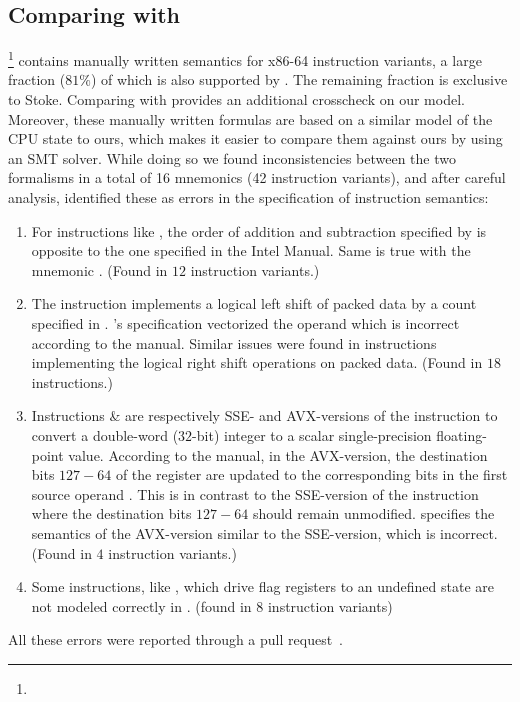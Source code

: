 \subsection{Comparing with \Stoke}\label{subsec:compare-stoke}
\footnote{} contains manually written semantics for \stokeIS{} x86-64 instruction variants, a large fraction ($81\%$) of which is also supported by \Strata. The remaining fraction is exclusive to Stoke. Comparing with \Stoke provides an additional crosscheck on our model.  Moreover, these manually written formulas are based on a similar model of the CPU state to ours, which makes it easier to compare them against ours by using an SMT solver. While doing so we found inconsistencies between the two formalisms in a total of 16 mnemonics (42 instruction variants), and after careful analysis, identified these as errors in the \Stoke specification of instruction semantics:
\begin{enumerate}%
    \item For instructions like  , the order of addition and subtraction specified by \Stoke is opposite to the one specified in the Intel Manual. Same is true with the mnemonic . (Found in $12$ instruction variants.)
    
    \item  The instruction  implements a logical left shift of packed data by a count specified in . \Stoke's specification vectorized the operand  which is incorrect according to the manual. Similar issues were found in instructions implementing the logical right shift operations on packed data. (Found in  $18$ instructions.)
    
    \item Instructions  \&   are respectively SSE- and AVX-versions of the instruction to  convert a double-word ($32$-bit) integer to a scalar single-precision floating-point value. According to the manual, in the AVX-version,  the  destination bits $127-64$ of the  register  are updated to the corresponding bits in the first source operand . This  is in contrast to the SSE-version of the instruction where the destination bits $127-64$ should remain unmodified. \Stoke specifies the semantics of the AVX-version similar to the SSE-version, which is incorrect.  (Found in $4$ instruction variants.)
    
    \item Some instructions, like , which drive flag registers to an undefined state are not modeled correctly in \Stoke.    (found in $8$ instruction variants)  
\end{enumerate}
All these errors were reported through a pull request~\cite{BugStoke983,BugStoke986}.

